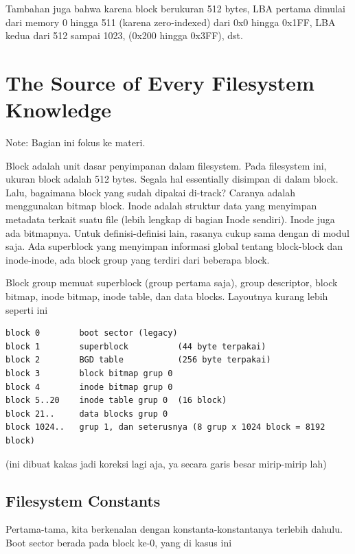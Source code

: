 Tambahan juga bahwa karena block berukuran 512 bytes, LBA pertama dimulai dari memory 0 hingga 511 (karena zero-indexed) dari 0x0 hingga 0x1FF, LBA kedua dari 512 sampai 1023, (0x200 hingga 0x3FF), dst.

\section{The Source of Every Filesystem Knowledge}

Note: Bagian ini fokus ke materi. 

Block adalah unit dasar penyimpanan dalam filesystem. Pada filesystem ini, ukuran block adalah 512 bytes. Segala hal essentially disimpan di dalam block. Lalu, bagaimana block yang sudah dipakai di-track? Caranya adalah menggunakan bitmap block. Inode adalah struktur data yang menyimpan metadata terkait suatu file (lebih lengkap di bagian Inode sendiri). Inode juga ada bitmapnya. Untuk definisi-definisi lain, rasanya cukup sama dengan di modul saja. Ada superblock yang menyimpan informasi global tentang block-block dan inode-inode, ada block group yang terdiri dari beberapa block.

Block group memuat superblock (group pertama saja), group descriptor, block bitmap, inode bitmap, inode table, dan data blocks. Layoutnya kurang lebih seperti ini

\begin{lstlisting}
block 0        boot sector (legacy)
block 1        superblock          (44 byte terpakai)
block 2        BGD table           (256 byte terpakai)
block 3        block bitmap grup 0
block 4        inode bitmap grup 0
block 5..20    inode table grup 0  (16 block)
block 21..     data blocks grup 0
block 1024..   grup 1, dan seterusnya (8 grup x 1024 block = 8192 block)
\end{lstlisting}
(ini dibuat kakas jadi koreksi lagi aja, ya secara garis besar mirip-mirip lah)


\subsection{Filesystem Constants}

Pertama-tama, kita berkenalan dengan konstanta-konstantanya terlebih dahulu. Boot sector berada pada block ke-0, yang di kasus ini 

